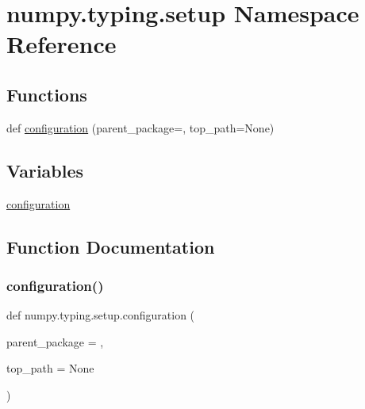 \hypertarget{namespacenumpy_1_1typing_1_1setup}{}\section{numpy.\+typing.\+setup Namespace Reference}
\label{namespacenumpy_1_1typing_1_1setup}
\subsection*{Functions}
\begin{DoxyCompactItemize}
\item 
def \hyperlink{namespacenumpy_1_1typing_1_1setup_a0b3b67c9c400bf503c34c786ac9d51a2}{configuration} (parent\+\_\+package=\textquotesingle{}\textquotesingle{}, top\+\_\+path=None)
\end{DoxyCompactItemize}
\subsection*{Variables}
\begin{DoxyCompactItemize}
\item 
\hyperlink{namespacenumpy_1_1typing_1_1setup_ab3dfee8da1c29b93f01890d356036707}{configuration}
\end{DoxyCompactItemize}


\subsection{Function Documentation}
\mbox{\label{namespacenumpy_1_1typing_1_1setup_a0b3b67c9c400bf503c34c786ac9d51a2}} 
\subsubsection{\texorpdfstring{configuration()}{configuration()}}
{\footnotesize\ttfamily def numpy.\+typing.\+setup.\+configuration (\begin{DoxyParamCaption}\item[{}]{parent\+\_\+package = {\ttfamily \textquotesingle{}\textquotesingle{}},  }\item[{}]{top\+\_\+path = {\ttfamily None} }\end{DoxyParamCaption})}



